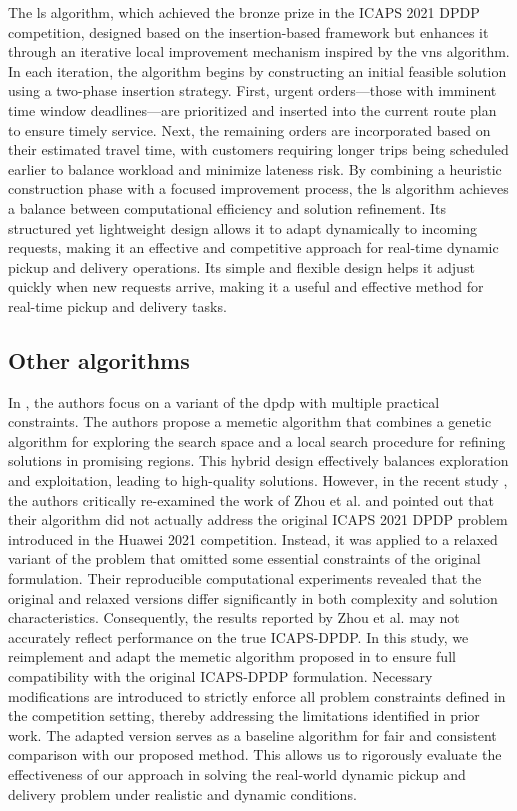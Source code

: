 \documentclass[]{interact}
\begin{document}
The \gls{ls} algorithm, which achieved the bronze prize in the ICAPS 2021 DPDP competition, designed based on the insertion-based framework but enhances it through an iterative local improvement mechanism inspired by the \gls{vns} algorithm. In each iteration, the algorithm begins by constructing an initial feasible solution using a two-phase insertion strategy. First, urgent orders—those with imminent time window deadlines—are prioritized and inserted into the current route plan to ensure timely service. Next, the remaining orders are incorporated based on their estimated travel time, with customers requiring longer trips being scheduled earlier to balance workload and minimize lateness risk.
By combining a heuristic construction phase with a focused improvement process, the \gls{ls} algorithm achieves a balance between computational efficiency and solution refinement. Its structured yet lightweight design allows it to adapt dynamically to incoming requests, making it an effective and competitive approach for real-time dynamic pickup and delivery operations. Its simple and flexible design helps it adjust quickly when new requests arrive, making it a useful and effective method for real-time pickup and delivery tasks.

\subsection{Other algorithms}
\label{sec:other_algo}
In \cite{zhou2024memetic}, the authors focus on a variant of the \gls{dpdp} with multiple practical constraints. The authors propose a memetic algorithm that combines a genetic algorithm for exploring the search space and a local search procedure for refining solutions in promising regions. This hybrid design effectively balances exploration and exploitation, leading to high-quality solutions. However, in the recent study \cite{horvath2025recent}, the authors critically re-examined the work of Zhou et al. and pointed out that their algorithm did not actually address the original ICAPS 2021 DPDP problem introduced in the Huawei 2021 competition. Instead, it was applied to a relaxed variant of the problem that omitted some essential constraints of the original formulation. Their reproducible computational experiments revealed that the original and relaxed versions differ significantly in both complexity and solution characteristics. Consequently, the results reported by Zhou et al. may not accurately reflect performance on the true ICAPS-DPDP. In this study, we reimplement and adapt the memetic algorithm proposed in \cite{zhou2024memetic} to ensure full compatibility with the original ICAPS-DPDP formulation. Necessary modifications are introduced to strictly enforce all problem constraints defined in the competition setting, thereby addressing the limitations identified in prior work. The adapted version serves as a baseline algorithm for fair and consistent comparison with our proposed method. This allows us to rigorously evaluate the effectiveness of our approach in solving the real-world dynamic pickup and delivery problem under realistic and dynamic conditions.
\end{document}
